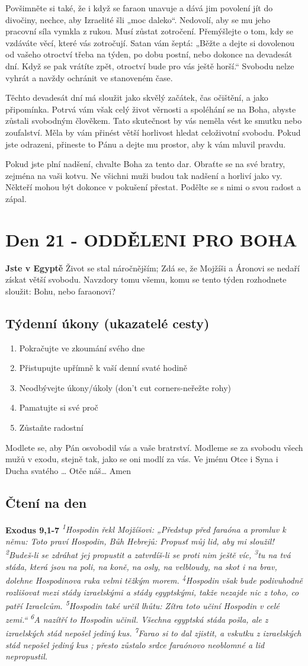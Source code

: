 \documentclass[11pt]{article}
\newcommand{\zacatekTretiTyden}{
  \textbf{Jste v Egyptě} \newline
  Život se stal náročnějším; Zdá se, že Mojžíši a Áronovi se nedaří získat větší svobodu. Navzdory tomu všemu,
komu se tento týden rozhodnete sloužit: Bohu, nebo faraonovi?

\subsection*{Týdenní úkony (ukazatelé cesty)}
\begin{enumerate}
  \item Pokračujte ve zkoumání svého dne
  \item Přistupujte upřímně k vaší denní svaté hodině
  \item Neodbývejte úkony/úkoly (don’t cut corners-neřežte rohy)
  \item Pamatujte si své proč
  \item Zůstaňte radostní
\end{enumerate}
Modlete se, aby Pán osvobodil vás a vaše bratrství. \newline
Modleme se za svobodu všech mužů v exodu, stejně tak, jako se oni modlí za vás.\newline
Ve jménu Otce i Syna i Ducha svatého …  Otče náš… Amen
}
\begin{document}
Povšimněte si také, že i když se faraon unavuje a dává jim povolení jít do divočiny, nechce, aby Izraelité
šli „moc daleko“. Nedovolí, aby se mu jeho pracovní síla vymkla z rukou. Musí zůstat zotročení.
Přemýšlejte o tom, kdy se vzdáváte věcí, které vás zotročují. Satan vám šeptá: „Běžte a dejte si dovolenou
od vašeho otroctví třeba na týden, po dobu postní, nebo dokonce na devadesát dní. Když se pak vrátíte
zpět, otroctví bude pro vás ještě horší.“ Svobodu nelze vyhrát a navždy ochránit ve stanoveném čase.

Těchto devadesát dní má sloužit jako skvělý začátek, čas očištění, a jako připomínka. Potrvá vám však
celý život věrnosti a spoléhání se na Boha, abyste zůstali svobodným člověkem.
Tato skutečnost by vás neměla vést ke smutku nebo zoufalství. Měla by vám přinést větší horlivost hledat
celoživotní svobodu. Pokud jste odrazeni, přineste to Pánu a dejte mu prostor, aby k vám mluvil pravdu.

Pokud jste plní nadšení, chvalte Boha za tento dar. Obraťte se na své bratry, zejména na vaši kotvu. Ne
všichni muži budou tak nadšení a horliví jako vy. Někteří mohou být dokonce v pokušení přestat. Podělte
se s nimi o svou radost a zápal.

\newpage
\section{Den 21 - ODDĚLENI PRO BOHA}
\zacatekTretiTyden
\subsection*{Čtení na den}
\textbf{Exodus 9,1-7}
\newline
\textit{
\textsuperscript{1}Hospodin řekl Mojžíšovi: „Předstup před faraóna a promluv k němu: Toto praví Hospodin, Bůh Hebrejů: Propusť můj lid, aby mi sloužil!
\textsuperscript{2}Budeš-li se zdráhat jej propustit a zatvrdíš-li se proti nim ještě víc,
\textsuperscript{3}tu na tvá stáda, která jsou na poli, na koně, na osly, na velbloudy, na skot i na brav, dolehne Hospodinova ruka velmi těžkým morem.
\textsuperscript{4}Hospodin však bude podivuhodně rozlišovat mezi stády izraelskými a stády egyptskými, takže nezajde nic z toho, co patří Izraelcům.
\textsuperscript{5}Hospodin také určil lhůtu: Zítra toto učiní Hospodin v celé zemi.“
\textsuperscript{6}A nazítří to Hospodin učinil. Všechna egyptská stáda pošla, ale z izraelských stád nepošel jediný kus. 
\textsuperscript{7}Farao si to dal zjistit, a vskutku z izraelských stád nepošel jediný kus ; přesto zůstalo srdce faraónovo neoblomné a lid nepropustil.
}
\end{document}
